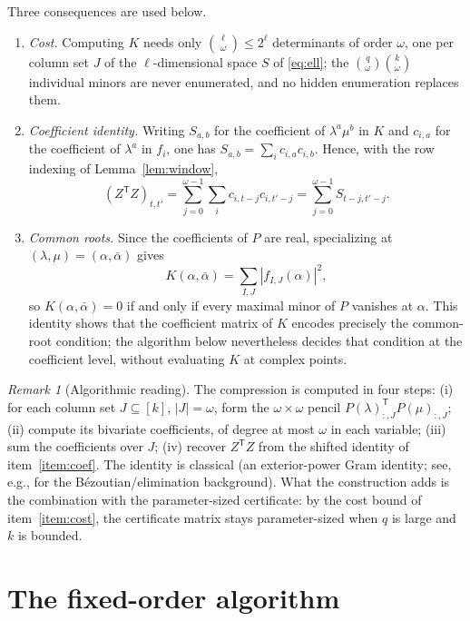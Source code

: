\documentclass[journal]{IEEEtran}
\theoremstyle{plainn}
\theoremstyle{remark}
\newtheorem{remark}{Remark}
\begin{document}
Three consequences are used below.
\begin{enumerate}[label=(\roman*)]
	\item\label{item:cost} \emph{Cost.} Computing $K$ needs only
	$\binom{\ell}{\omega}\le2^{\ell}$ determinants of order $\omega$, one per
	column set $J$ of the $\ell$-dimensional space $S$ of \eqref{eq:ell}; the
	$\binom q\omega\binom k\omega$ individual minors are never enumerated,
	and no hidden enumeration replaces them.
	\item\label{item:coef} \emph{Coefficient identity.} Writing $S_{a,b}$
	for the coefficient of $\lambda^a\mu^b$ in $K$ and $c_{i,a}$ for the
	coefficient of $\lambda^a$ in $f_i$, one has
	$S_{a,b}=\sum_i c_{i,a}c_{i,b}$. Hence, with the row indexing of
	Lemma~\ref{lem:window},
	\[
	(Z^{\mathsf T}Z)_{t,t'}
	=\sum_{j=0}^{\omega-1}\sum_i c_{i,t-j}c_{i,t'-j}
	=\sum_{j=0}^{\omega-1}S_{t-j,t'-j}.
	\]
	\item\label{item:roots} \emph{Common roots.} Since the coefficients of
	$P$ are real, specializing at $(\lambda,\mu)=(\alpha,\bar\alpha)$ gives
	\[
	K(\alpha,\bar\alpha)
	=\sum_{I,J}\left|f_{I,J}(\alpha)\right|^2,
	\]
	so $K(\alpha,\bar\alpha)=0$ if and only if every maximal minor of $P$
	vanishes at $\alpha$. This identity shows that the coefficient matrix of
	$K$ encodes precisely the common-root condition; the algorithm below
	nevertheless decides that condition at the coefficient level, without
	evaluating $K$ at complex points.
\end{enumerate}

\begin{remark}[Algorithmic reading]\label{rem:algo}
	The compression is computed in four steps:
	(i) for each column set $J\subseteq[k]$, $|J|=\omega$, form the
	$\omega\times\omega$ pencil $P(\lambda)_{:,J}^{\mathsf T}P(\mu)_{:,J}$;
	(ii) compute its bivariate coefficients, of degree at most $\omega$ in
	each variable;
	(iii) sum the coefficients over $J$;
	(iv) recover $Z^{\mathsf T}Z$ from the shifted identity of
	item~\ref{item:coef}.
	The identity is classical (an exterior-power Gram identity; see, e.g.,
	\cite{emi99} for the B\'ezoutian/elimination background). What the
	construction adds is the combination with the parameter-sized
	certificate: by the cost bound of item~\ref{item:cost}, the certificate
	matrix stays parameter-sized when $q$ is large and $k$ is bounded.
\end{remark}

\section{The fixed-order algorithm}\label{sec:fixedq}
\end{document}
